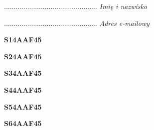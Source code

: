 \begin{turn}{90}\begin{minipage}{\linewidth} \vspace{20mm} ................................................  \textit{Imię i nazwisko}\end{minipage}\end{turn}

\begin{turn}{90}\begin{minipage}{\linewidth} \vspace{20mm} ................................................  \textit{Adres e-mailowy}\end{minipage}\end{turn}

\begin{turn}{90}\huge \begin{minipage}{\linewidth} \vspace{10mm}\textbf{S14AAF45}\end{minipage}\end{turn}

\begin{turn}{90}\huge \begin{minipage}{\linewidth} \vspace{10mm}\textbf{S24AAF45}\end{minipage}\end{turn}

\begin{turn}{90}\huge \begin{minipage}{\linewidth} \vspace{10mm}\textbf{S34AAF45}\end{minipage}\end{turn}

\begin{turn}{90}\huge \begin{minipage}{\linewidth} \vspace{10mm}\textbf{S44AAF45}\end{minipage}\end{turn}

\begin{turn}{90}\huge \begin{minipage}{\linewidth} \vspace{10mm}\textbf{S54AAF45}\end{minipage}\end{turn}

\begin{turn}{90}\huge \begin{minipage}{\linewidth} \vspace{10mm}\textbf{S64AAF45}\end{minipage}\end{turn}

